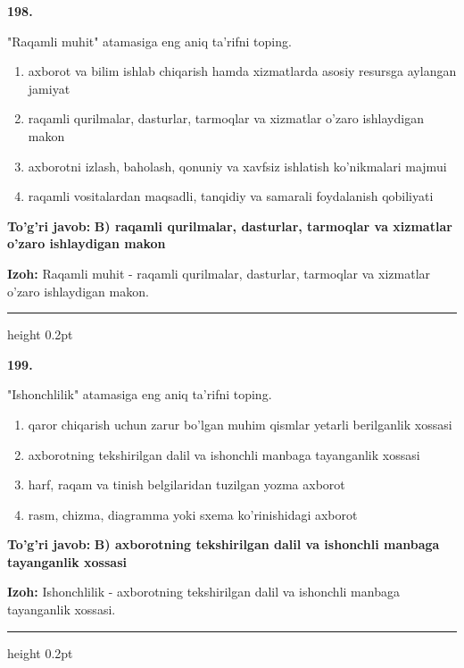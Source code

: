 \documentclass[10pt,a4paper,oneside]{article}
\begin{document}
\noindent\textbf{\color{ink}198.}
\par
"Raqamli muhit" atamasiga eng aniq ta'rifni toping.
\begin{enumerate}[label=\Alph*),leftmargin=9mm]
\item axborot va bilim ishlab chiqarish hamda xizmatlarda asosiy resursga aylangan jamiyat
\item raqamli qurilmalar, dasturlar, tarmoqlar va xizmatlar o'zaro ishlaydigan makon
\item axborotni izlash, baholash, qonuniy va xavfsiz ishlatish ko'nikmalari majmui
\item raqamli vositalardan maqsadli, tanqidiy va samarali foydalanish qobiliyati
\end{enumerate}
\begin{tcolorbox}[enhanced,breakable,colback=teal!4,colframe=teal!50!black,boxrule=0.5pt,arc=1.1mm,left=3mm,right=3mm,top=1.7mm,bottom=1.7mm,before skip=2mm,after skip=2mm]
\textbf{\color{teal}To'g'ri javob:} \textbf{B) raqamli qurilmalar, dasturlar, tarmoqlar va xizmatlar o'zaro ishlaydigan makon}
\par\smallskip
\textbf{Izoh:} Raqamli muhit - raqamli qurilmalar, dasturlar, tarmoqlar va xizmatlar o'zaro ishlaydigan makon.
\end{tcolorbox}
\vspace{2mm}\hrule height 0.2pt \vspace{3mm}

\noindent\textbf{\color{ink}199.}
\par
"Ishonchlilik" atamasiga eng aniq ta'rifni toping.
\begin{enumerate}[label=\Alph*),leftmargin=9mm]
\item qaror chiqarish uchun zarur bo'lgan muhim qismlar yetarli berilganlik xossasi
\item axborotning tekshirilgan dalil va ishonchli manbaga tayanganlik xossasi
\item harf, raqam va tinish belgilaridan tuzilgan yozma axborot
\item rasm, chizma, diagramma yoki sxema ko'rinishidagi axborot
\end{enumerate}
\begin{tcolorbox}[enhanced,breakable,colback=teal!4,colframe=teal!50!black,boxrule=0.5pt,arc=1.1mm,left=3mm,right=3mm,top=1.7mm,bottom=1.7mm,before skip=2mm,after skip=2mm]
\textbf{\color{teal}To'g'ri javob:} \textbf{B) axborotning tekshirilgan dalil va ishonchli manbaga tayanganlik xossasi}
\par\smallskip
\textbf{Izoh:} Ishonchlilik - axborotning tekshirilgan dalil va ishonchli manbaga tayanganlik xossasi.
\end{tcolorbox}
\vspace{2mm}\hrule height 0.2pt \vspace{3mm}
\end{document}

